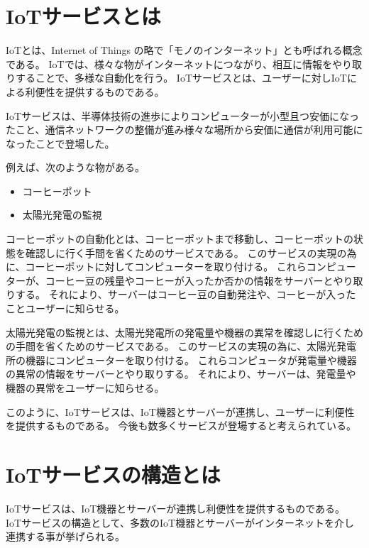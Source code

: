 \section{IoTサービスとは}
IoTとは、Internet of Things の略で「モノのインターネット」とも呼ばれる概念である。
IoTでは、様々な物がインターネットにつながり、相互に情報をやり取りすることで、多様な自動化を行う。
IoTサービスとは、ユーザーに対しIoTによる利便性を提供するものである。

IoTサービスは、半導体技術の進歩によりコンピューターが小型且つ安価になったこと、通信ネットワークの整備が進み様々な場所から安価に通信が利用可能になったことで登場した。

例えば、次のような物がある。
\begin{itemize}
	\item コーヒーポット
	\item 太陽光発電の監視
\end{itemize}

コーヒーポットの自動化とは、コーヒーポットまで移動し、コーヒーポットの状態を確認しに行く手間を省くためのサービスである。
このサービスの実現の為に、コーヒーポットに対してコンピューターを取り付ける。
これらコンピューターが、コーヒー豆の残量やコーヒーが入ったか否かの情報をサーバーとやり取りする。
それにより、サーバーはコーヒー豆の自動発注や、コーヒーが入ったことユーザーに知らせる。

太陽光発電の監視とは、太陽光発電所の発電量や機器の異常を確認しに行くための手間を省くためのサービスである。
このサービスの実現の為に、太陽光発電所の機器にコンピューターを取り付ける。
これらコンピュータが発電量や機器の異常の情報をサーバーとやり取りする。
それにより、サーバーは、発電量や機器の異常をユーザーに知らせる。

このように、IoTサービスは、IoT機器とサーバーが連携し、ユーザーに利便性を提供するものである。
今後も数多くサービスが登場すると考えられている。

\section{IoTサービスの構造とは}
IoTサービスは、IoT機器とサーバーが連携し利便性を提供するものである。
IoTサービスの構造として、多数のIoT機器とサーバーがインターネットを介し連携する事が挙げられる。

